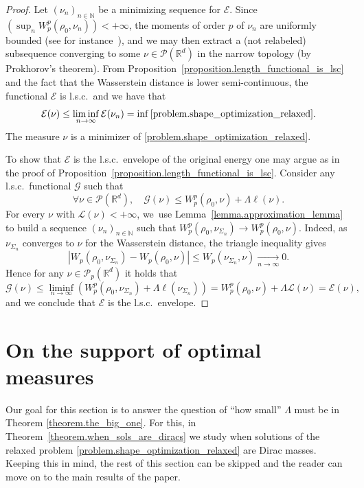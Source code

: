 \documentclass[11pt]{article}
\numberwithin{equation}{section}
\theoremstyle{definition}
\newcommand\E{\mathcal{E}}
\newcommand\G{\mathcal{G}}
\newcommand{\RR}{\mathbb{R}}
\begin{document}
\begin{proof}
Let $\left(\nu_n\right)_{n \in \mathbb{N}}$ be a minimizing sequence for $\mathcal{E}$. Since $\left(\sup_n W_p^p(\rho_0, \nu_n)\right)<+\infty$, the moments of order $p$ of $\nu_n$ are uniformly bounded (see for instance~\cite[Th.\,5.11]{santambrogio2015optimal}), and we may then extract a (not relabeled) subsequence converging to some $\nu \in \mathcal{P}(\RR^d)$ in the narrow topology (by Prokhorov's theorem). From Proposition~\ref{proposition.length_functional_is_lsc} and the fact that the Wasserstein distance is lower semi-continuous, the functional $\mathcal{E}$ is l.s.c.~and we have that
\[
\mathcal{E}(\nu) \le \liminf_{n \to \infty} \mathcal{E}(\nu_n) = \inf \eqref{problem.shape_optimization_relaxed}.
\]
The measure $\nu$ is a minimizer of \eqref{problem.shape_optimization_relaxed}.

To show that $\E$ is the l.s.c.~envelope of the original energy one may argue as in the proof of Proposition~\ref{proposition.length_functional_is_lsc}. Consider any l.s.c.~functional $\G$ such that
\begin{equation*}
\forall \nu \in \mathcal{P}(\RR^d),\quad \G(\nu)\leq W_p^p(\rho_0,\nu) +\Lambda \ell(\nu).
\end{equation*}
For every $\nu$ with $\mathcal{L}(\nu)<+\infty$, we~use Lemma~\ref{lemma.approximation_lemma} to build a sequence $(\nu_n)_{n \in \mathbb{N}}$ such that $W_p^p(\rho_0,\nu_{\Sigma_n}) \to W_p^p(\rho_0,\nu)$. Indeed, as $\nu_{\Sigma_n}$ converges to $\nu$ for the Wasserstein distance, the triangle inequality gives
\[
\left|
W_p(\rho_0, \nu_{\Sigma_n}) - W_p(\rho_0, \nu)
\right|
\le
W_p(\nu_{\Sigma_n}, \nu) \xrightarrow[n \to \infty]{} 0.
\]
Hence for any $\nu \in \mathcal{P}_p(\RR^d)$ it holds that
\begin{equation*}
\G(\nu)\leq \liminf_{n \to \infty} \left(W_p^p(\rho_0,\nu_{\Sigma_n})
+
\Lambda \ell(\nu_{\Sigma_n})\right)= W_p^p(\rho_0,\nu) +\Lambda \mathcal{L}(\nu)=\E(\nu),
\end{equation*}
and we conclude that $\mathcal{E}$ is the l.s.c.~envelope.
\end{proof}

\section{On the support of optimal measures}\label{section.geometric_properties_transport_map}
Our goal for this section is to answer the question of ``how small'' $\Lambda$ must be in Theorem \ref{theorem.the_big_one}. For this, in Theorem~\ref{theorem.when_sols_are_diracs} we study when solutions of the relaxed problem \eqref{problem.shape_optimization_relaxed} are Dirac masses. Keeping this in mind, the rest of this section can be skipped and the reader can move on to the main results of the paper.
\end{document}
